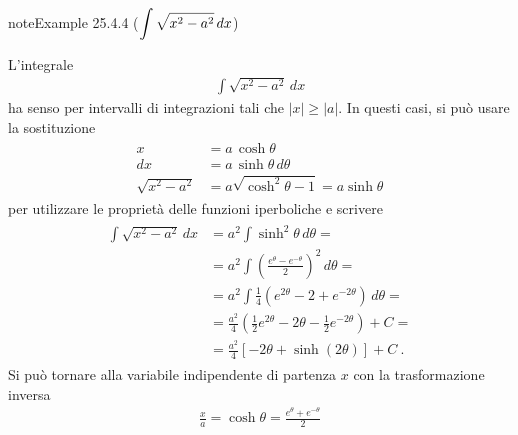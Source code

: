 \documentclass[letterpaper,10pt,italian]{jupyterBook}
\begin{document}
\begin{sphinxadmonition}{note}{Example 25.4.4 (\protect\(\displaystyle \int \sqrt{x^2 - a^2} \,  dx\protect\))}



\sphinxAtStartPar
L’integrale
\begin{equation*}
\begin{split}\int \sqrt{x^2 - a^2} \,  dx\end{split}
\end{equation*}
\sphinxAtStartPar
ha senso per intervalli di integrazioni tali che \(|x| \ge |a|\). In questi casi, si può usare la sostituzione
\begin{equation*}
\begin{split}\begin{aligned}
   x & = a \, \cosh \theta \\
  dx & = a \, \sinh \theta \, d \theta \\
  \sqrt{x^2 - a^2} & = a \sqrt{\cosh^2 \theta - 1} = a \sinh \theta
\end{aligned}\end{split}
\end{equation*}
\sphinxAtStartPar
per utilizzare le proprietà delle funzioni iperboliche e scrivere
\begin{equation*}
\begin{split}\begin{aligned}
  \int \sqrt{x^2 - a^2} \, dx
   & = a^2 \int \sinh^2 \theta \, d \theta = \\
   & = a^2 \int \left( \frac{e^\theta - e^{-\theta}}{2} \right)^2 \, d \theta = \\
   & = a^2 \int \frac{1}{4} \left( e^{2 \theta} - 2 + e^{-2 \theta} \right) \, d \theta = \\
   & = \frac{a^2}{4} \left( \frac{1}{2} e^{2 \theta} - 2 \theta - \frac{1}{2} e^{-2 \theta} \right) + C = \\
   & = \frac{a^2}{4} \left[ -2 \theta + \sinh \left( 2 \theta \right) \right] + C \ .
\end{aligned}\end{split}
\end{equation*}
\sphinxAtStartPar
Si può tornare alla variabile indipendente di partenza \(x\) con la trasformazione inversa
\begin{equation*}
\begin{split}\frac{x}{a} = \cosh \theta = \frac{e^{\theta} + e^{-\theta}}{2}\end{split}
\end{equation*}\begin{equation*}

\end{equation*}
\end{sphinxadmonition}
\end{document}
